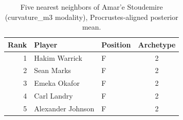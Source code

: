 \begin{table}[htbp]
  \centering\small
  \begin{tabular}{rllc}
    \toprule
    Rank & Player & Position & Archetype \\
    \midrule
    1 & Hakim Warrick & F & 2 \\
    2 & Sean Marks & F & 2 \\
    3 & Emeka Okafor & F & 2 \\
    4 & Carl Landry & F & 2 \\
    5 & Alexander Johnson & F & 2 \\
    \bottomrule
  \end{tabular}
  \caption{Five nearest neighbors of Amar'e Stoudemire (curvature_m3 modality), Procrustes-aligned posterior mean.}
  \label{tab:Amar_e_Stoudemire_neighbors_curvature_m3}
\end{table}

